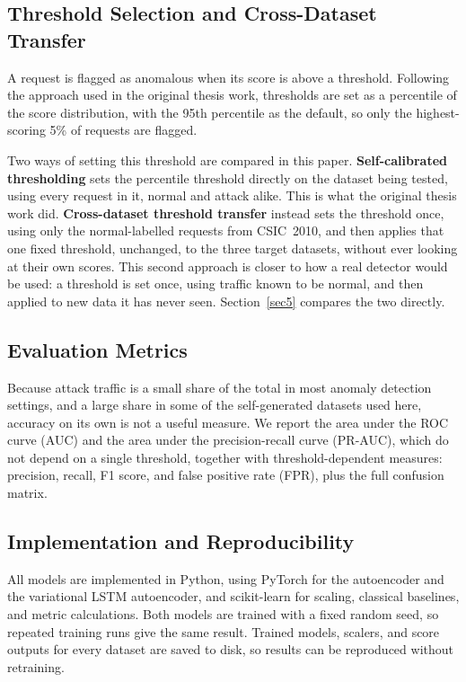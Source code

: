\documentclass[futureinternet,article,submit,moreauthors]{Definitions/mdpi}
\begin{document}
\subsection{Threshold Selection and Cross-Dataset Transfer} \label{sec4.7}

A request is flagged as anomalous when its score is above a threshold. Following the approach used in the original thesis work, thresholds are set as a percentile of the score distribution, with the 95th percentile as the default, so only the highest-scoring 5\% of requests are flagged.

Two ways of setting this threshold are compared in this paper. \textbf{Self-calibrated thresholding} sets the percentile threshold directly on the dataset being tested, using every request in it, normal and attack alike. This is what the original thesis work did. \textbf{Cross-dataset threshold transfer} instead sets the threshold once, using only the normal-labelled requests from CSIC~2010, and then applies that one fixed threshold, unchanged, to the three target datasets, without ever looking at their own scores. This second approach is closer to how a real detector would be used: a threshold is set once, using traffic known to be normal, and then applied to new data it has never seen. Section~\ref{sec5} compares the two directly.

\subsection{Evaluation Metrics}

Because attack traffic is a small share of the total in most anomaly detection settings, and a large share in some of the self-generated datasets used here, accuracy on its own is not a useful measure. We report the area under the ROC curve (AUC) and the area under the precision-recall curve (PR-AUC), which do not depend on a single threshold, together with threshold-dependent measures: precision, recall, F1 score, and false positive rate (FPR), plus the full confusion matrix.

\subsection{Implementation and Reproducibility}

All models are implemented in Python, using PyTorch for the autoencoder and the variational LSTM autoencoder, and scikit-learn for scaling, classical baselines, and metric calculations. Both models are trained with a fixed random seed, so repeated training runs give the same result. Trained models, scalers, and score outputs for every dataset are saved to disk, so results can be reproduced without retraining.
\end{document}
